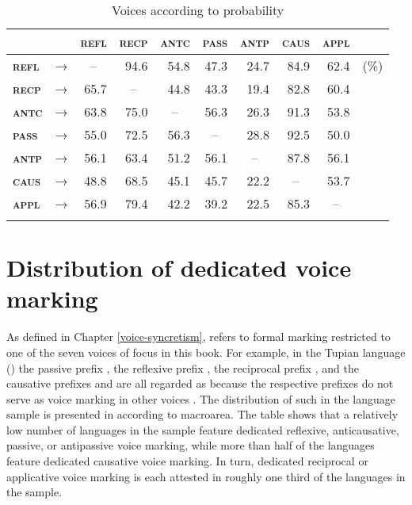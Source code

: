 \begin{table}
	\setlength{\tabcolsep}{3pt}
	\begin{tabularx}{.78\textwidth}{llrrrrrrrl}
		\lsptoprule
		& & \multicolumn{1}{c}{\textbf{\textsc{refl}}} & \multicolumn{1}{c}{\textbf{\textsc{recp}}} & \multicolumn{1}{c}{\textbf{\textsc{antc}}} & \multicolumn{1}{c}{\textbf{\textsc{pass}}} & \multicolumn{1}{c}{\textbf{\textsc{antp}}} & \multicolumn{1}{c}{\textbf{\textsc{caus}}} &  \multicolumn{1}{c}{\textbf{\textsc{appl}}} & \\
		\midrule
		\textbf{\textsc{refl}} & → & \multicolumn{1}{c}{--} & 94.6 & 54.8 & 47.3 & 24.7 & 84.9 & 62.4 & (\%) \\
		\textbf{\textsc{recp}} & → & 65.7 & \multicolumn{1}{c}{--} & 44.8 & 43.3 & 19.4 & 82.8 & 60.4 & \\
		\textbf{\textsc{antc}} & → & 63.8 & 75.0 & \multicolumn{1}{c}{--} & 56.3 & 26.3 & 91.3 & 53.8 & \\
		\textbf{\textsc{pass}} & → & 55.0 & 72.5 & 56.3 & \multicolumn{1}{c}{--} & 28.8 & 92.5 & 50.0 & \\
		\textbf{\textsc{antp}} & → & 56.1 & 63.4 & 51.2 & 56.1 & \multicolumn{1}{c}{--} & 87.8 & 56.1 & \\
		\textbf{\textsc{caus}} & → & 48.8 & 68.5 & 45.1 & 45.7 & 22.2 & \multicolumn{1}{c}{--} & 53.7 & \\
		\textbf{\textsc{appl}} & → & 56.9 & 79.4 & 42.2 & 39.2 & 22.5 & 85.3 & \multicolumn{1}{c}{--} & \\
		\lspbottomrule
	\end{tabularx}
	\caption{Voices according to probability}
	\label{tab:ch6:voice-probability}
\end{table}

\section{Distribution of dedicated voice marking} \label{dist:dedicated}
As defined in Chapter \ref{voice-syncretism},  refers to formal marking restricted to one of the seven voices of focus in this book. For example, in the Tupian language  () the passive prefix , the reflexive prefix , the reciprocal prefix , and the causative prefixes  and  are all regarded as  because the respective prefixes do not serve as voice marking in other voices \citep{gabas:1999}. The distribution of such  in the language sample is presented in  according to macroarea. The table shows that a relatively low number of languages in the sample feature dedicated reflexive, anticausative, passive, or antipassive voice marking, while more than half of the languages feature dedicated causative voice marking. In turn, dedicated reciprocal or applicative voice marking is each attested in roughly one third of the languages in the sample. 

